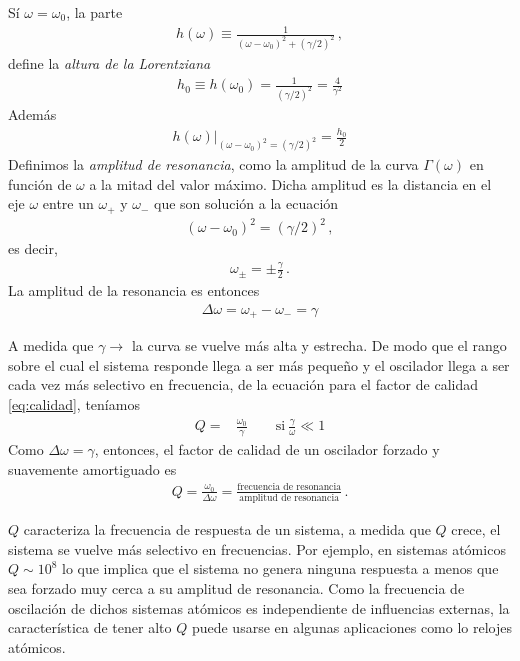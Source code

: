 Sí $\omega=\omega_0$, la parte
\begin{align*}
  h(\omega)\equiv\frac{1}{(\omega-\omega_0)^2+(\gamma/2)^2}\,,
\end{align*}
define la \emph{altura de la Lorentziana}
\begin{align*}
 h_0\equiv h(\omega_0)=\frac{1}{(\gamma/2)^2}=\frac{4}{\gamma^2}
\end{align*}
Además 
\begin{align*}
  \left.h(\omega)\right|_{(\omega-\omega_0)^2=(\gamma/2)^2}=\frac{h_0}{2}
\end{align*}
Definimos la \emph{amplitud de resonancia}, como la amplitud de la curva $\Gamma(\omega)$ en función de $\omega$ a la mitad del valor máximo. Dicha amplitud es la distancia en el eje $\omega$ entre un $\omega_+$ y $\omega_-$ que son solución a la ecuación
\begin{align*}
  (\omega-\omega_0)^2=(\gamma/2)^2\,,
\end{align*}
es decir,
\begin{align*}
  \omega_{\pm}=\pm \frac{\gamma}{2}\,.
\end{align*}
La amplitud de la resonancia es entonces
\begin{align*}
  \Delta\omega=\omega_+-\omega_-=\gamma
\end{align*}

A medida que $\gamma\to$ la curva se vuelve más alta y estrecha. De modo que el rango sobre el cual el sistema responde llega a ser más pequeño y el oscilador llega a ser cada vez más selectivo en frecuencia, de la ecuación para el factor de calidad \eqref{eq:calidad}, teníamos
\begin{align*}
Q=&\frac{\omega_0}{\gamma}\qquad\text{si}\ \frac{\gamma}{\omega}\ll 1  
\end{align*}
Como $\Delta\omega=\gamma$, entonces, el factor de calidad de  un oscilador forzado y suavemente amortiguado es
\begin{align*}
  Q=\frac{\omega_0}{\Delta \omega}=\frac{\text{frecuencia de resonancia}}{\text{amplitud de resonancia}}\,.
\end{align*}

$Q$ caracteriza la frecuencia de respuesta de un sistema, a medida que $Q$ crece, el sistema se vuelve más selectivo en frecuencias. Por ejemplo, en sistemas atómicos $Q\sim 10^8$ lo que implica que el sistema no genera ninguna respuesta a menos que sea forzado muy cerca a su amplitud de resonancia. Como la frecuencia de oscilación de dichos sistemas atómicos es independiente de influencias externas, la característica de tener alto $Q$ puede usarse en algunas aplicaciones como lo relojes atómicos. 

